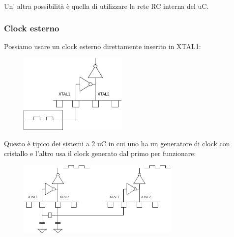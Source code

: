 Un' altra possibilità è quella di utilizzare la rete RC interna del uC.

\subsubsection{Clock esterno}
Possiamo usare un clock esterno direttamente inserito in XTAL1:
\begin{figure}[H]
    \centering
    \includegraphics[width=200px]{images/17_Clock/external_clock.png}
\end{figure}
Questo è tipico dei sistemi a 2 uC in cui uno ha un generatore di clock con cristallo e l'altro usa il clock generato dal primo per funzionare:
\begin{figure}[H]
    \centering
    \includegraphics[width=300px]{images/17_Clock/back_to_back.png}
\end{figure}



